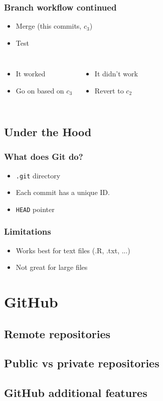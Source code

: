 \documentclass{beamer}
\begin{document}
\begin{frame}[fragile]
    \frametitle{Branch workflow continued}
    \begin{itemize}
        \item Merge (this commits, $c_3$)
        \item Test
    \end{itemize}
    \begin{columns}
        \begin{itemize}
        \item It worked
        \item Go on based on $c_3$
        \end{itemize}
        \begin{itemize}
            \item It didn't work
            \item Revert to $c_2$
        \end{itemize}
    \end{columns}
\end{frame}

\subsection{Under the Hood}

\begin{frame}[fragile]
    \frametitle{What does Git do?}
    \begin{itemize}
        \item \verb|.git| directory
        \item Each commit has a unique ID. 
        \item \verb|HEAD| pointer
    \end{itemize}
\end{frame}

\begin{frame}
    \frametitle{Limitations}
    \begin{itemize}
        \item Works best for text files (.R, .txt, ...)
        \item Not great for large files 
    \end{itemize}
\end{frame}

\section{GitHub}

\subsection{Remote repositories}

\subsection{Public vs private repositories}

\subsection{GitHub additional features}
\end{document}
